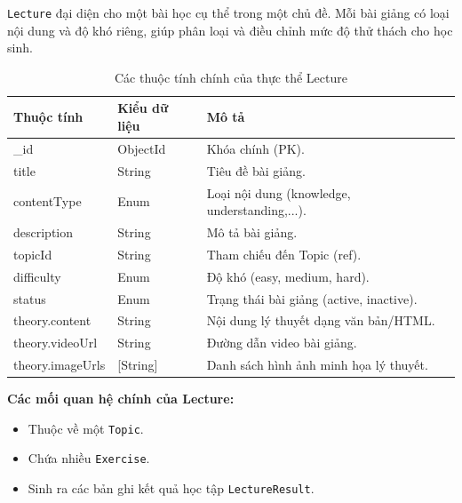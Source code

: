 \texttt{Lecture} đại diện cho một bài học cụ thể trong một chủ đề. 
Mỗi bài giảng có loại nội dung và độ khó riêng, giúp phân loại và điều chỉnh mức độ thử thách cho học sinh.
\begin{table}[H]
	\centering
	\begin{tabularx}{\textwidth}{|l|l|X|}
		\hline
		\textbf{Thuộc tính} & \textbf{Kiểu dữ liệu} & \textbf{Mô tả} \\ \hline
		\_id & ObjectId & Khóa chính (PK). \\ \hline
		title & String & Tiêu đề bài giảng. \\ \hline
		contentType & Enum & Loại nội dung (knowledge, understanding,...). \\ \hline
		description & String & Mô tả bài giảng. \\ \hline
		topicId & String & Tham chiếu đến Topic (ref). \\ \hline
		difficulty & Enum & Độ khó (easy, medium, hard). \\ \hline
		status & Enum & Trạng thái bài giảng (active, inactive). \\ \hline
		theory.content & String & Nội dung lý thuyết dạng văn bản/HTML. \\ \hline
		theory.videoUrl & String & Đường dẫn video bài giảng. \\ \hline
		theory.imageUrls & [String] & Danh sách hình ảnh minh họa lý thuyết. \\ \hline
	\end{tabularx}
	\caption{Các thuộc tính chính của thực thể Lecture}
\end{table}
\newline
\textbf{Các mối quan hệ chính của Lecture:}
\begin{itemize}
	\item Thuộc về một \texttt{Topic}.
	\item Chứa nhiều \texttt{Exercise}.
	\item Sinh ra các bản ghi kết quả học tập \texttt{LectureResult}.
\end{itemize}


